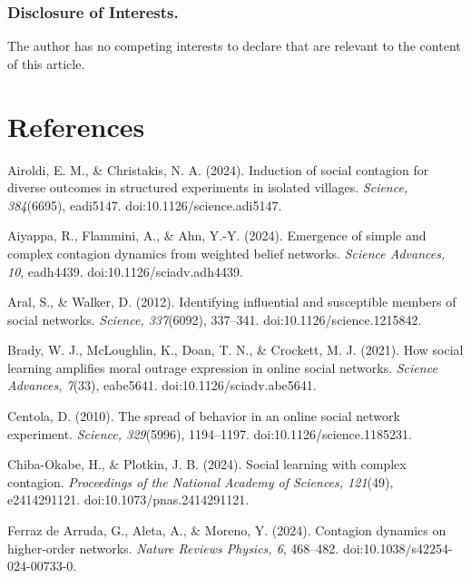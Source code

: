 \documentclass[11pt]{article}
\begin{document}
\subsubsection*{Disclosure of Interests.}
The author has no competing interests to declare that are relevant to the content of this article.

\section*{References}

\begin{flushleft}\small
\noindent\hangindent=0.5in 
Airoldi, E. M., \& Christakis, N. A. (2024). Induction of social contagion for diverse outcomes in structured experiments in isolated villages. \textit{Science, 384}(6695), eadi5147. doi:10.1126/science.adi5147.

\noindent\hangindent=0.5in 

Aiyappa, R., Flammini, A., \& Ahn, Y.-Y. (2024). Emergence of simple and complex contagion dynamics from weighted belief networks. \textit{Science Advances, 10}, eadh4439. doi:10.1126/sciadv.adh4439.

\noindent\hangindent=0.5in 

Aral, S., \& Walker, D. (2012). Identifying influential and susceptible members of social networks. \textit{Science, 337}(6092), 337–341. doi:10.1126/science.1215842.

\noindent\hangindent=0.5in 

Brady, W. J., McLoughlin, K., Doan, T. N., \& Crockett, M. J. (2021). How social learning amplifies moral outrage expression in online social networks. \textit{Science Advances, 7}(33), eabe5641. doi:10.1126/sciadv.abe5641.

\noindent\hangindent=0.5in 

Centola, D. (2010). The spread of behavior in an online social network experiment. \textit{Science, 329}(5996), 1194–1197. doi:10.1126/science.1185231.

\noindent\hangindent=0.5in 

Chiba-Okabe, H., \& Plotkin, J. B. (2024). Social learning with complex contagion. \textit{Proceedings of the National Academy of Sciences, 121}(49), e2414291121. doi:10.1073/pnas.2414291121.

\noindent\hangindent=0.5in 

Ferraz de Arruda, G., Aleta, A., \& Moreno, Y. (2024). Contagion dynamics on higher-order networks. \textit{Nature Reviews Physics, 6}, 468–482. doi:10.1038/s42254-024-00733-0.


\end{flushleft}
\end{document}
